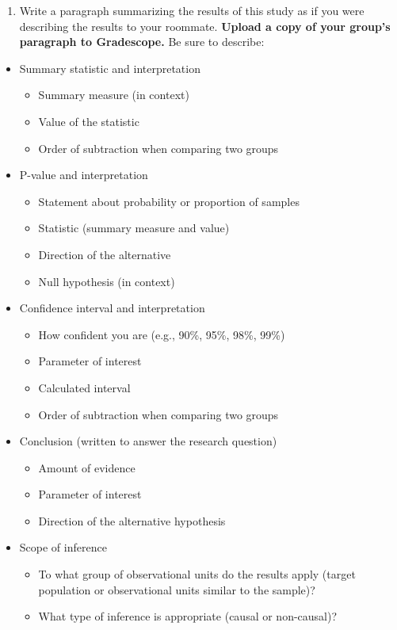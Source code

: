 \documentclass[
]{report}
\providecommand{\tightlist}{%
  \setlength{\itemsep}{0pt}\setlength{\parskip}{0pt}}
\begin{document}
\vspace{0.2in}

\begin{enumerate}
\def\labelenumi{\arabic{enumi}.}
\setcounter{enumi}{13}
\tightlist
\item
  Write a paragraph summarizing the results of this study as if you were describing the results to your roommate. \textbf{Upload a copy of your group's paragraph to Gradescope.} Be sure to describe:
\end{enumerate}

\begin{itemize}
\item
  Summary statistic and interpretation

  \begin{itemize}
  \item
    Summary measure (in context)
  \item
    Value of the statistic
  \item
    Order of subtraction when comparing two groups
  \end{itemize}
\item
  P-value and interpretation

  \begin{itemize}
  \item
    Statement about probability or proportion of samples
  \item
    Statistic (summary measure and value)
  \item
    Direction of the alternative
  \item
    Null hypothesis (in context)
  \end{itemize}
\item
  Confidence interval and interpretation

  \begin{itemize}
  \item
    How confident you are (e.g., 90\%, 95\%, 98\%, 99\%)
  \item
    Parameter of interest
  \item
    Calculated interval
  \item
    Order of subtraction when comparing two groups
  \end{itemize}
\item
  Conclusion (written to answer the research question)

  \begin{itemize}
  \item
    Amount of evidence
  \item
    Parameter of interest
  \item
    Direction of the alternative hypothesis
  \end{itemize}
\item
  Scope of inference

  \begin{itemize}
  \item
    To what group of observational units do the results apply (target population or observational units similar to the sample)?
  \item
    What type of inference is appropriate (causal or non-causal)?
  \end{itemize}
\end{itemize}
\end{document}
